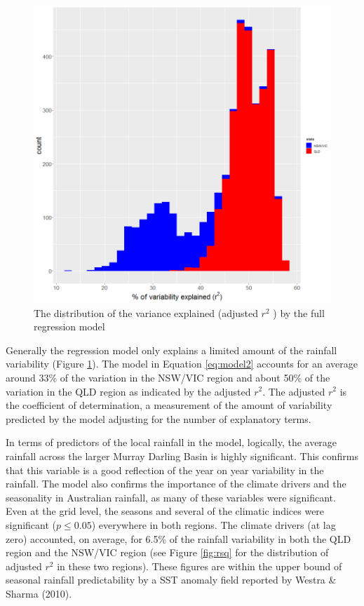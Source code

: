 \documentclass[fleqn,10pt,lineno]{wlpeerj} %
\theoremstyle{definition}
\theoremstyle{definition}
\theoremstyle{definition}
\theoremstyle{remark}
\begin{document}
\begin{figure}
\includegraphics[width=0.7\linewidth]{figures/rsq_fullmodel} \caption{The distribution of the variance explained (adjusted $r^2$ ) by the full regression model}\label{fig:rsqmodel}
\end{figure}

Generally the regression model only explains a limited amount of the
rainfall variability (Figure \ref{fig:rsqmodel}). The model in Equation
\eqref{eq:model2} accounts for an average around 33\% of the variation in
the NSW/VIC region and about 50\% of the variation in the QLD region as
indicated by the adjusted \(r^2\). The adjusted \(r^2\) is the
coefficient of determination, a measurement of the amount of variability
predicted by the model adjusting for the number of explanatory terms.

In terms of predictors of the local rainfall in the model, logically,
the average rainfall across the larger Murray Darling Basin is highly
significant. This confirms that this variable is a good reflection of
the year on year variability in the rainfall. The model also confirms
the importance of the climate drivers and the seasonality in Australian
rainfall, as many of these variables were significant. Even at the grid
level, the seasons and several of the climatic indices were significant
(\(p \leq 0.05\)) everywhere in both regions. The climate drivers (at
lag zero) accounted, on average, for 6.5\% of the rainfall variability
in both the QLD region and the NSW/VIC region (see Figure \ref{fig:rsq}
for the distribution of adjusted \(r^2\) in these two regions). These
figures are within the upper bound of seasonal rainfall predictability
by a SST anomaly field reported by Westra \& Sharma (2010).
\end{document}
